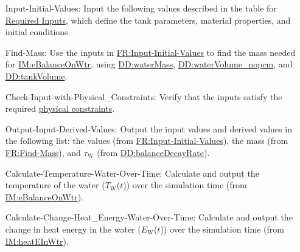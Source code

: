 \documentclass[12pt]{article}
\begin{document}
\begin{itemize}
\item[Input-Initial-Values:\phantomsection\label{inputInitVals}]{Input the following values described in the table for \hyperref[Table:ReqInputs]{Required Inputs}, which define the tank parameters, material properties, and initial conditions.}
\item[Find-Mass:\phantomsection\label{findMass}]{Use the inputs in \hyperref[inputInitVals]{FR:Input-Initial-Values} to find the mass needed for \hyperref[IM:eBalanceOnWtr]{IM:eBalanceOnWtr}, using \hyperref[DD:waterMass]{DD:waterMass}, \hyperref[DD:waterVolume.nopcm]{DD:waterVolume\_nopcm}, and \hyperref[DD:tankVolume]{DD:tankVolume}.}
\item[Check-Input-with-Physical\_Constraints:\phantomsection\label{checkWithPhysConsts}]{Verify that the inputs satisfy the required \hyperref[Sec:DataConstraints]{physical constraints}.}
\item[Output-Input-Derived-Values:\phantomsection\label{outputInputDerivVals}]{Output the input values and derived values in the following list: the values (from \hyperref[inputInitVals]{FR:Input-Initial-Values}), the mass (from \hyperref[findMass]{FR:Find-Mass}), and ${τ_{\text{W}}}$ (from \hyperref[DD:balanceDecayRate]{DD:balanceDecayRate}).}
\item[Calculate-Temperature-Water-Over-Time:\phantomsection\label{calcTempWtrOverTime}]{Calculate and output the temperature of the water (${T_{\text{W}}}$($t$)) over the simulation time (from \hyperref[IM:eBalanceOnWtr]{IM:eBalanceOnWtr}).}
\item[Calculate-Change-Heat\_Energy-Water-Over-Time:\phantomsection\label{calcChgHeatEnergyWtrOverTime}]{Calculate and output the change in heat energy in the water (${E_{\text{W}}}$($t$)) over the simulation time (from \hyperref[IM:heatEInWtr]{IM:heatEInWtr}).}
\end{itemize}
\end{document}
